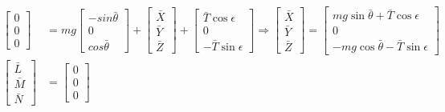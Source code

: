 \begin{equation}
    \label{eq:equilibrio}
    \begin{split}
        \begin{bmatrix}
            0 \\
            0 \\
            0
        \end{bmatrix} & = mg\begin{bmatrix}
                                -sin\bar{\theta} \\
                                0                \\
                                cos\bar{\theta}
                            \end{bmatrix} + \begin{bmatrix}
                                                \bar{X} \\
                                                \bar{Y} \\
                                                \bar{Z}
                                            \end{bmatrix} + \begin{bmatrix}
                                                                \bar{T} \cos\epsilon \\
                                                                0                    \\
                                                                -\bar{T} \sin\epsilon
                                                            \end{bmatrix}
        \Rightarrow \begin{bmatrix}
                        \bar{X} \\
                        \bar{Y} \\
                        \bar{Z}
                    \end{bmatrix} = \begin{bmatrix}
                                        mg\sin\bar{\theta} + \bar{T} \cos\epsilon \\
                                        0                                         \\
                                        -mg\cos\bar{\theta} - \bar{T} \sin\epsilon
                                    \end{bmatrix}
        \\
        \begin{bmatrix}
            \bar{L} \\
            \bar{M} \\
            \bar{N}
        \end{bmatrix} & = \begin{bmatrix}
                              0 \\
                              0 \\
                              0
                          \end{bmatrix}
    \end{split}
\end{equation}

